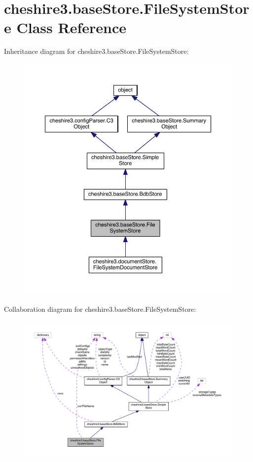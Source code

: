 \hypertarget{classcheshire3_1_1base_store_1_1_file_system_store}{\section{cheshire3.\-base\-Store.\-File\-System\-Store Class Reference}
\label{classcheshire3_1_1base_store_1_1_file_system_store}
}


Inheritance diagram for cheshire3.\-base\-Store.\-File\-System\-Store\-:
\nopagebreak
\begin{figure}[H]
\begin{center}
\leavevmode
\includegraphics[width=350pt]{classcheshire3_1_1base_store_1_1_file_system_store__inherit__graph}
\end{center}
\end{figure}


Collaboration diagram for cheshire3.\-base\-Store.\-File\-System\-Store\-:
\nopagebreak
\begin{figure}[H]
\begin{center}
\leavevmode
\includegraphics[width=350pt]{classcheshire3_1_1base_store_1_1_file_system_store__coll__graph}
\end{center}
\end{figure}
